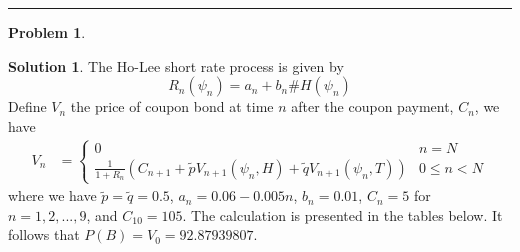 \documentclass[a4paper, 10pt]{article}
\theoremstyle{definition}
\newtheorem{problem}{Problem}
\theoremstyle{hSol}
\newtheorem*{solution}{Solution}
\begin{document}
\noindent\rule{16cm}{0.4pt}
\begin{problem} 
\end{problem}
\begin{solution} The Ho-Lee short rate process is given by
\begin{equation}
  R_n(\psi_n) = a_n + b_n\#H(\psi_n)
\end{equation}
Define $V_n$ the price of coupon bond at time $n$ after the coupon payment, $C_n$, we have
\begin{equation}
  \begin{split}
  V_n 
  &=\begin{cases}
  0 & n=N\\
  \frac{1}{1+R_{n}}\left(C_{n+1} + \tilde{p}V_{n+1}(\psi_n, H) + \tilde{q}V_{n+1}(\psi_n, T)\right) & 0\leq n < N
  \end{cases}
  \end{split}
\end{equation}
where we have $\tilde{p}=\tilde{q}=0.5$, $a_n=0.06-0.005n$, $b_n=0.01$, $C_{n}=5$ for $n=1,2,...,9$, and $C_{10}=105$. The calculation is presented in the tables below. It follows that $P(B)=V_0=92.87939807$.

\begin{landscape}


\end{landscape}
\end{solution}
\end{document}
